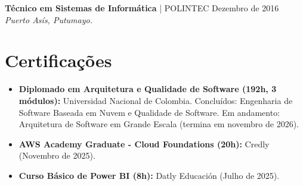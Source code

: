\documentclass[11pt,a4paper]{article}
\begin{document}
\noindent
\textbf{Técnico em Sistemas de Informática} | POLINTEC \hfill Dezembro de 2016 \\
\textit{Puerto Asís, Putumayo.}

\section*{Certificações}
\begin{itemize}[leftmargin=*, noitemsep]
    \item \textbf{Diplomado em Arquitetura e Qualidade de Software (192h, 3 módulos):} Universidad Nacional de Colombia. Concluídos: Engenharia de Software Baseada em Nuvem e Qualidade de Software. Em andamento: Arquitetura de Software em Grande Escala (termina em novembro de 2026).
    \item \textbf{AWS Academy Graduate - Cloud Foundations (20h):} Credly (Novembro de 2025).
    \item \textbf{Curso Básico de Power BI (8h):} Datly Educación (Julho de 2025).
\end{itemize}
\end{document}
